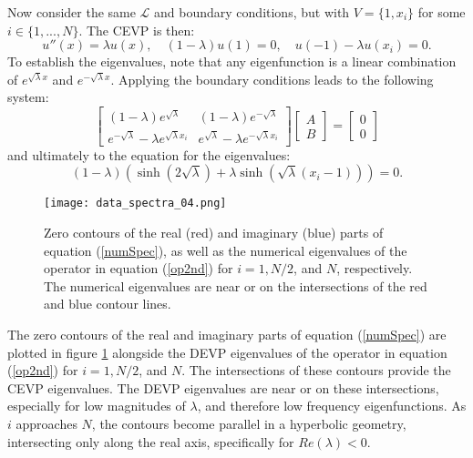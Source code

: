 \documentclass{sfuthesis}
\begin{document}
Now consider the same $\mathcal{L}$ and boundary conditions, but with $V = \{ 1, x_i\}$ for some $i \in \{ 1,...,N\}$.
The CEVP is then:
\begin{equation} \label{op2nd}
u''(x) = \lambda u(x), \quad (1 - \lambda) u(1) = 0, \quad u(-1) - \lambda u(x_i) = 0 .
\end{equation}
To establish the eigenvalues, note that any eigenfunction is a linear combination of $e^{\sqrt{\lambda}x}$ and $e^{-\sqrt{\lambda}x}$.
Applying the boundary conditions leads to the following system:
\begin{equation}
\begin{bmatrix}
(1 - \lambda) e^{\sqrt{\lambda}} & (1 - \lambda) e^{-\sqrt{\lambda}} \\
e^{-\sqrt{\lambda}} - \lambda e^{\sqrt{\lambda} x_i} & e^{\sqrt{\lambda}} - \lambda e^{-\sqrt{\lambda} x_i} 
\end{bmatrix}
\begin{bmatrix} A \\ B \end{bmatrix} = \begin{bmatrix} 0 \\ 0 \end{bmatrix}
\end{equation}
and ultimately to the equation for the eigenvalues:
\begin{equation} \label{numSpec}
(1 - \lambda) \left ( \sinh(2 \sqrt{\lambda}) + \lambda \sinh( \sqrt{\lambda} (x_i - 1) ) \right ) = 0 .
\end{equation}

\begin{figure}
\texttt{[image: data\_spectra\_04.png]}
\caption{Zero contours of the real (red) and imaginary (blue) parts of equation (\ref{numSpec}), as well as the numerical eigenvalues of the operator in equation (\ref{op2nd})
for $i = 1, N/2$, and $N$, respectively.
The numerical eigenvalues are near or on the intersections of the red and blue contour lines.}
\label{fig:Exact2ndV}
\end{figure}

The zero contours of the real and imaginary parts of equation (\ref{numSpec}) are plotted in figure \ref{fig:Exact2ndV} alongside the DEVP eigenvalues of the operator in equation (\ref{op2nd})
for $i = 1, N/2$, and $N$.
The intersections of these contours provide the CEVP eigenvalues.
The DEVP eigenvalues are near or on these intersections, especially for low magnitudes of $\lambda$, and therefore low frequency eigenfunctions.
As $i$ approaches $N$, the contours become parallel in a hyperbolic geometry, intersecting only along the real axis, specifically for $Re(\lambda)<0$.
\end{document}
